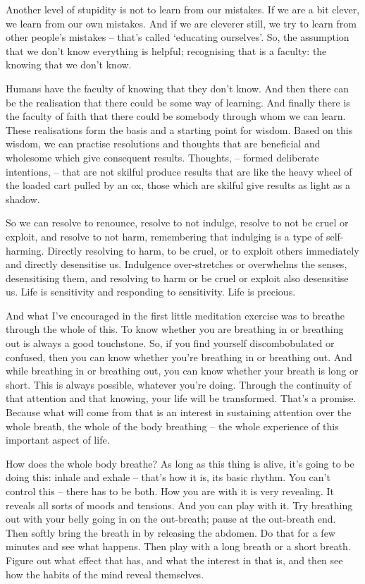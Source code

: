 Another level of stupidity is not to learn from our mistakes. If we are a bit
clever, we learn from our own mistakes. And if we are cleverer still, we try to
learn from other people's mistakes -- that's called `educating ourselves'. So,
the assumption that we don't know everything is helpful; recognising that is a
faculty: the knowing that we don't know.

Humans have the faculty of knowing that they don't know. And then there can be
the realisation that there could be some way of learning. And 
finally there is the faculty of faith that there could be somebody through whom we can learn. These realisations form the
basis and a starting point for wisdom. Based on this wisdom, we can practise resolutions and thoughts
that are beneficial and wholesome which give consequent results. Thoughts, -- formed
deliberate intentions, -- that are not skilful produce results that are like the heavy
wheel of the loaded cart pulled by an ox, those which are skilful give results as light as a
shadow.

So we can resolve to renounce, resolve to not indulge, resolve to not be cruel or
exploit, and resolve to not harm, remembering that indulging is a type of self-harming.
Directly resolving to harm, to be cruel, or to exploit others immediately and directly desensitise us.
Indulgence over-stretches or overwhelms the senses, desensitising them, and
resolving to harm or be cruel or exploit also desensitise us. Life is
sensitivity and responding to sensitivity. Life is precious.

And what I've encouraged in the first little meditation exercise was to
breathe through the whole of this. To know whether you are breathing in or
breathing out is always a good touchstone. So, if you find yourself
discombobulated or confused, then you can know whether you're breathing in or
breathing out. And while breathing in or breathing out, you can know whether
your breath is long or short. This is always possible, whatever you're doing.
Through the continuity of that attention and that knowing, your life will be
transformed. That's a promise. Because what will come from that is an interest
in sustaining attention over the whole breath, the whole of the body breathing
-- the whole experience of this important aspect of life.

How does the whole body breathe? As long as this thing is alive, it's going to
be doing this: inhale and exhale -- that's how it is, its basic rhythm. You
can't control this -- there has to be both. How you are with it is very
revealing. It reveals all sorts of moods and tensions. And you can play with it.
Try breathing out with your belly going in on the out-breath; pause at the out-breath end. Then
softly bring the breath in by releasing the abdomen. Do that for a
few minutes and see what happens. Then play with a long breath or a short
breath. Figure out what effect that has, and what the interest in that is, and
then see how the habits of the mind reveal themselves.

